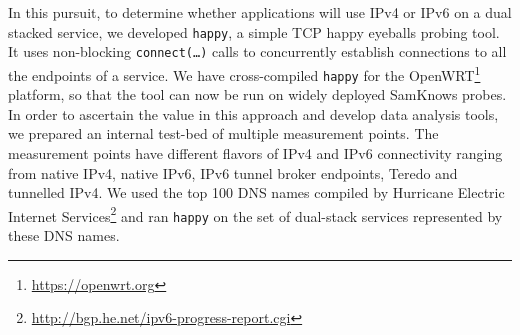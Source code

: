 In this pursuit, to determine whether applications will use IPv4 or IPv6 on a
dual stacked service, we developed \texttt{happy}, a simple TCP happy eyeballs
probing tool. It uses non-blocking \texttt{connect(\ldots)} calls to
concurrently establish connections to all the endpoints of a service.
We have cross-compiled \texttt{happy} for the
OpenWRT\footnote{\url{https://openwrt.org}} platform, so that the tool can now
be run on widely deployed SamKnows probes. In order to ascertain the value in
this approach and develop data analysis tools, we prepared an internal
test-bed of multiple measurement points. The measurement points have different
flavors of IPv4 and IPv6 connectivity ranging from native IPv4, native IPv6,
IPv6 tunnel broker endpoints, Teredo and tunnelled IPv4. We used the top 100
DNS names compiled by Hurricane Electric Internet
Services\footnote{\url{http://bgp.he.net/ipv6-progress-report.cgi}} and ran
\texttt{happy} on the set of dual-stack services represented by these DNS
names.

